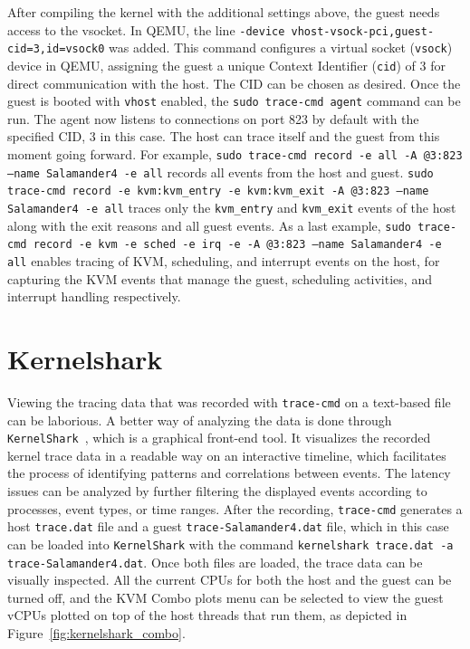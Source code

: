 \documentclass[MMR,Master,english]{style/twbook}
\begin{document}
\clearpage

\noindent After compiling the kernel with the additional settings above, the guest needs access to the vsocket. In QEMU, the line \texttt{-device vhost-vsock-pci,guest-cid=3,id=vsock0} was added. This command configures a virtual socket (\texttt{vsock}) device in QEMU, assigning the guest a unique Context Identifier (\texttt{cid}) of 3 for direct communication with the host. The CID can be chosen as desired. Once the guest is booted with \texttt{vhost} enabled, the \texttt{sudo trace-cmd agent} command can be run.  The agent now listens to connections on port 823 by default with the specified CID, 3 in this case. The host can trace itself and the guest from this moment going forward. For example, \texttt{sudo trace-cmd record -e all -A @3:823 --name Salamander4 -e all} records all events from the host and guest. \texttt{sudo trace-cmd record -e kvm:kvm\_entry -e kvm:kvm\_exit -A @3:823 --name Salamander4 -e all} traces only the \texttt{kvm\_entry} and \texttt{kvm\_exit} events of the host along with the exit reasons and all guest events. As a last example, \texttt{sudo trace-cmd record -e kvm -e sched -e irq -e -A @3:823 --name Salamander4 -e all} enables tracing of KVM, scheduling, and interrupt events on the host, for capturing the KVM events that manage the guest, scheduling activities, and interrupt handling respectively.

\section{Kernelshark}\label{sec:kernelshark}
Viewing the tracing data that was recorded with \texttt{trace-cmd} on a text-based file can be laborious. A better way of analyzing the data is done through \texttt{KernelShark}~\cite{KernelShark}, which is a graphical front-end tool. It visualizes the recorded kernel trace data in a readable way on an interactive timeline, which facilitates the process of identifying patterns and correlations between events. The latency issues can be analyzed by further filtering the displayed events according to processes, event types, or time ranges. After the recording, \texttt{trace-cmd} generates a host \texttt{trace.dat} file and a guest \texttt{trace-Salamander4.dat} file, which in this case can be loaded into \texttt{KernelShark} with the command \texttt{kernelshark trace.dat -a trace-Salamander4.dat}. Once both files are loaded, the trace data can be visually inspected. All the current CPUs for both the host and the guest can be turned off, and the KVM Combo plots menu can be selected to view the guest vCPUs plotted on top of the host threads that run them, as depicted in Figure~\ref{fig:kernelshark_combo}.
\end{document}
